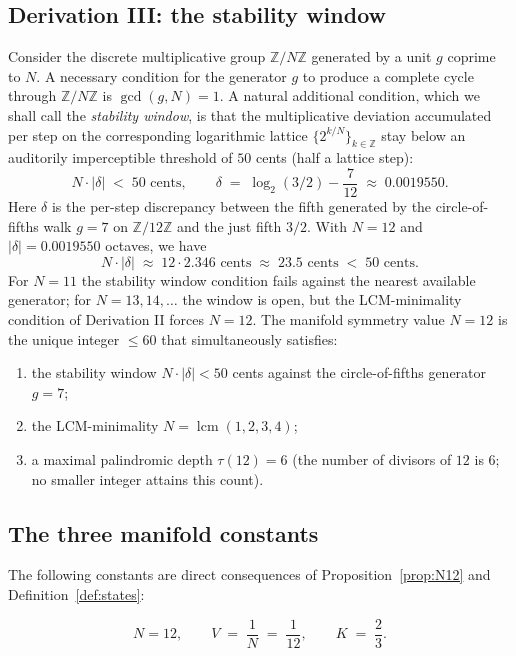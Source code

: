 \documentclass[11pt,a4paper]{article}
\theoremstyle{definition}
\theoremstyle{remark}
\newcommand{\Z}{\mathbb{Z}}
\DeclareMathOperator{\lcm}{lcm}
\begin{document}
\subsection{Derivation III: the stability window}

Consider the discrete multiplicative group $\Z/N\Z$ generated by a unit $g$ coprime to $N$. A necessary condition for the generator $g$ to produce a complete cycle through $\Z/N\Z$ is $\gcd(g,N)=1$. A natural additional condition, which we shall call the \emph{stability window}, is that the multiplicative deviation accumulated per step on the corresponding logarithmic lattice $\{2^{k/N}\}_{k\in\Z}$ stay below an auditorily imperceptible threshold of $50$ cents (half a lattice step):
\[
N\cdot|\delta| \;<\; 50 \text{ cents}, \qquad \delta \;=\; \log_{2}(3/2) - \frac{7}{12} \;\approx\; 0.0019550.
\]
Here $\delta$ is the per-step discrepancy between the fifth generated by the circle-of-fifths walk $g=7$ on $\Z/12\Z$ and the just fifth $3/2$. With $N=12$ and $|\delta| = 0.0019550$ octaves, we have
\[
N\cdot|\delta| \;\approx\; 12\cdot 2.346\text{ cents} \;\approx\; 23.5 \text{ cents} \;<\; 50 \text{ cents}.
\]
For $N=11$ the stability window condition fails against the nearest available generator; for $N=13,14,\ldots$ the window is open, but the LCM-minimality condition of Derivation II forces $N=12$. The manifold symmetry value $N=12$ is the unique integer $\le 60$ that simultaneously satisfies:
\begin{enumerate}[leftmargin=*,label=(\roman*)]
\item the stability window $N\cdot|\delta|<50$ cents against the circle-of-fifths generator $g=7$;
\item the LCM-minimality $N=\lcm(1,2,3,4)$;
\item a maximal palindromic depth $\tau(12)=6$ (the number of divisors of $12$ is $6$; no smaller integer attains this count).
\end{enumerate}

\subsection{The three manifold constants}

The following constants are direct consequences of Proposition~\ref{prop:N12} and Definition~\ref{def:states}:

\begin{equation}\label{eq:constants}
\boxed{\;N = 12, \qquad V \;=\; \frac{1}{N} \;=\; \frac{1}{12}, \qquad K \;=\; \frac{2}{3}.\;}
\end{equation}
\end{document}
